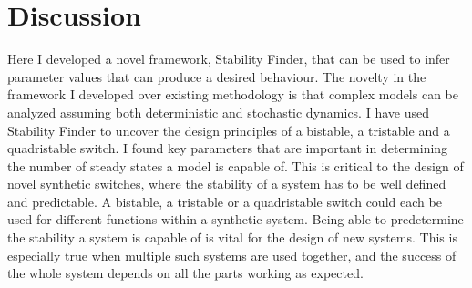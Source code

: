 
\section{Discussion}
 
 Here I developed a novel framework, Stability Finder, that can be used to infer parameter values that can produce a desired behaviour. The novelty in the framework I developed over existing methodology is that complex models can be analyzed assuming both deterministic and stochastic dynamics. I have used Stability Finder to uncover the design principles of a bistable, a tristable and a quadristable switch. I found key parameters that are important in determining the number of steady states a model is capable of. This is critical to the design of novel synthetic switches, where the stability of a system has to be well defined and predictable. A bistable, a tristable or a quadristable switch could each be used for different functions within a synthetic system. Being able to predetermine the stability a system is capable of is vital for the design of new systems. This is especially true when multiple such systems are used together, and the success of the whole system depends on all the parts working as expected. 
 
